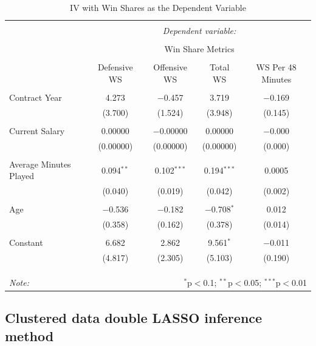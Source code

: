 \documentclass[12pt]{article}
\begin{document}
	\begin{table}[!htbp] \centering 
		\caption{IV with Win Shares as the Dependent Variable} 
		\label{} 
		\begin{tabular}{@{\extracolsep{5pt}}lcccc} 
			\\[-1.8ex]\hline 
			\hline \\[-1.8ex] 
			& \multicolumn{4}{c}{\textit{Dependent variable:}} \\ 
			\cline{2-5} 
			\\[-1.8ex] & \multicolumn{4}{c}{Win Share Metrics} \\ 
			\\[-1.8ex] & Defensive WS & Offensive WS & Total WS & WS Per 48 Minutes\\ 
			\hline \\[-1.8ex] 
			Contract Year & 4.273 & $-$0.457 & 3.719 & $-$0.169 \\ 
			& (3.700) & (1.524) & (3.948) & (0.145) \\ 
			& & & & \\ 
			Current Salary & 0.00000 & $-$0.00000 & 0.00000 & $-$0.000 \\ 
			& (0.00000) & (0.00000) & (0.00000) & (0.000) \\ 
			& & & & \\ 
			Average Minutes Played & 0.094$^{**}$ & 0.102$^{***}$ & 0.194$^{***}$ & 0.0005 \\ 
			& (0.040) & (0.019) & (0.042) & (0.002) \\ 
			& & & & \\ 
			Age & $-$0.536 & $-$0.182 & $-$0.708$^{*}$ & 0.012 \\ 
			& (0.358) & (0.162) & (0.378) & (0.014) \\ 
			& & & & \\ 
			Constant & 6.682 & 2.862 & 9.561$^{*}$ & $-$0.011 \\ 
			& (4.817) & (2.305) & (5.103) & (0.190) \\ 
			& & & & \\ 
			\hline \\[-1.8ex] 
			\hline 
			\hline \\[-1.8ex] 
			\textit{Note:}  & \multicolumn{4}{r}{$^{*}$p$<$0.1; $^{**}$p$<$0.05; $^{***}$p$<$0.01} \\ 
		\end{tabular} 
	\end{table} 
	
	\subsection{Clustered data double LASSO inference method}
	
\end{document}
